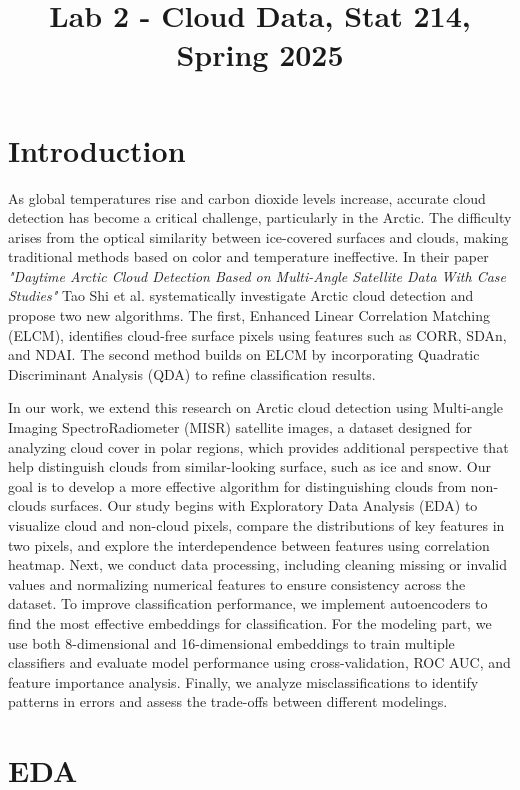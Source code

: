 \documentclass[10pt,letterpaper]{article}
\title{Lab 2 - Cloud Data, Stat 214, Spring 2025\vspace{-2em}}
\begin{document}
\maketitle


\section{Introduction}
As global temperatures rise and carbon dioxide levels increase, accurate cloud detection has become a critical challenge, particularly in the Arctic. The difficulty arises from the optical similarity between ice-covered surfaces and clouds, making traditional methods based on color and temperature ineffective. In their paper \textit{"Daytime Arctic Cloud Detection Based on Multi-Angle Satellite Data With Case Studies"} Tao Shi et al. \cite{shi2008} systematically investigate Arctic cloud detection and propose two new algorithms. The first, Enhanced Linear Correlation Matching (ELCM), identifies cloud-free surface pixels using features such as CORR, SDAn, and NDAI. The second method builds on ELCM by incorporating Quadratic Discriminant Analysis (QDA) to refine classification results.

In our work, we extend this research on Arctic cloud detection using  Multi-angle Imaging SpectroRadiometer (MISR) satellite images, a dataset designed for analyzing cloud cover in polar regions, which provides additional perspective that help distinguish clouds from similar-looking surface, such as ice and snow. Our goal is to develop a more effective algorithm for distinguishing clouds from non-clouds surfaces. Our study begins with Exploratory Data Analysis (EDA) to visualize cloud and non-cloud pixels, compare the distributions of key features in two pixels, and explore the interdependence between features using correlation heatmap. Next, we conduct data processing, including cleaning missing or invalid values and normalizing numerical features to ensure consistency across the dataset. To improve classification performance, we implement autoencoders to find the most effective embeddings for classification. For the modeling part, we use both 8-dimensional and 16-dimensional embeddings to train multiple classifiers and evaluate model performance using cross-validation, ROC AUC, and feature importance analysis. Finally, we analyze misclassifications to identify patterns in errors and assess the trade-offs between different modelings. 


\section{EDA}
\end{document}
